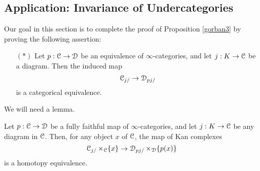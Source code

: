 \subsection{Application: Invariance of  Undercategories}\label{slim}

Our goal in this section is to complete the proof of Proposition \ref{gorban3} by proving the
following assertion:

\begin{itemize}
\item[$(\ast)$] Let $p: \operatorname{\mathcal{C}} \rightarrow \operatorname{\mathcal{D}}$ be an equivalence of $\infty$-categories, and let
$j: K \rightarrow \operatorname{\mathcal{C}}$ be a diagram. Then the induced map
$$ \operatorname{\mathcal{C}}_{j/} \rightarrow \operatorname{\mathcal{D}}_{p j/}$$
is a categorical equivalence.
\end{itemize}

We will need a lemma.

\begin{lemma}\label{blaha}
Let $p: \operatorname{\mathcal{C}} \rightarrow \operatorname{\mathcal{D}}$ be a fully faithful map of $\infty$-categories, and let $j: K \rightarrow \operatorname{\mathcal{C}}$
be any diagram in $\operatorname{\mathcal{C}}$. Then, for any object $x$ of $\operatorname{\mathcal{C}}$, the map of Kan complexes
$$ \operatorname{\mathcal{C}}_{j/} \times_{\operatorname{\mathcal{C}}} \{x\} \rightarrow \operatorname{\mathcal{D}}_{p j/ } \times_{\operatorname{\mathcal{D}}} \{p(x) \}$$ is a homotopy equivalence.
\end{lemma}

